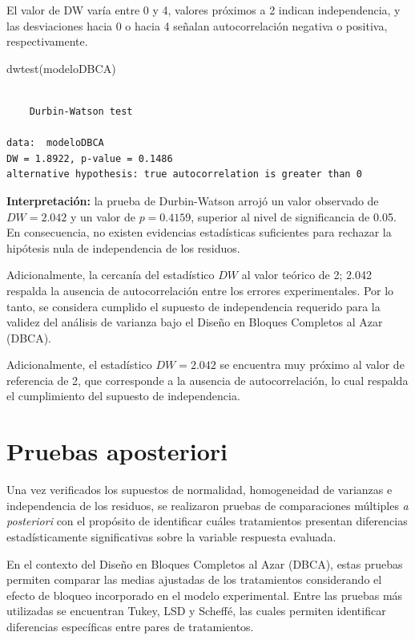 \documentclass[
  spanish,
  letterpaper,
  DIV=11,
  numbers=noendperiod]{scrreprt}
\newenvironment{Shaded}{\begin{snugshade}}{\end{snugshade}}
\newcommand{\FunctionTok}[1]{\textcolor[rgb]{0.28,0.35,0.67}{#1}}
\newcommand{\NormalTok}[1]{\textcolor[rgb]{0.00,0.23,0.31}{#1}}
\begin{document}
El valor de DW varía entre 0 y 4, valores próximos a 2 indican
independencia, y las desviaciones hacia 0 o hacia 4 señalan
autocorrelación negativa o positiva, respectivamente.

\begin{Shaded}
\begin{Highlighting}[]
\FunctionTok{dwtest}\NormalTok{(modeloDBCA)}
\end{Highlighting}
\end{Shaded}

\begin{verbatim}

    Durbin-Watson test

data:  modeloDBCA
DW = 1.8922, p-value = 0.1486
alternative hypothesis: true autocorrelation is greater than 0
\end{verbatim}

\textbf{Interpretación:} la prueba de Durbin-Watson arrojó un valor
observado de \(DW = 2.042\) y un valor de \(p = 0.4159\), superior al
nivel de significancia de 0.05. En consecuencia, no existen evidencias
estadísticas suficientes para rechazar la hipótesis nula de
independencia de los residuos.

Adicionalmente, la cercanía del estadístico \(DW\) al valor teórico de
2; 2.042 respalda la ausencia de autocorrelación entre los errores
experimentales. Por lo tanto, se considera cumplido el supuesto de
independencia requerido para la validez del análisis de varianza bajo el
Diseño en Bloques Completos al Azar (DBCA).

Adicionalmente, el estadístico \(DW = 2.042\) se encuentra muy próximo
al valor de referencia de 2, que corresponde a la ausencia de
autocorrelación, lo cual respalda el cumplimiento del supuesto de
independencia.

\section{Pruebas aposteriori}\label{pruebas-aposteriori-1}

Una vez verificados los supuestos de normalidad, homogeneidad de
varianzas e independencia de los residuos, se realizaron pruebas de
comparaciones múltiples \emph{a posteriori} con el propósito de
identificar cuáles tratamientos presentan diferencias estadísticamente
significativas sobre la variable respuesta evaluada.

En el contexto del Diseño en Bloques Completos al Azar (DBCA), estas
pruebas permiten comparar las medias ajustadas de los tratamientos
considerando el efecto de bloqueo incorporado en el modelo experimental.
Entre las pruebas más utilizadas se encuentran Tukey, LSD y Scheffé, las
cuales permiten identificar diferencias específicas entre pares de
tratamientos.
\end{document}
